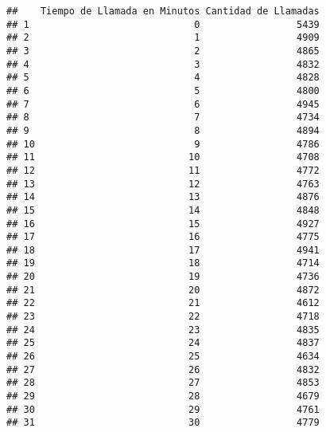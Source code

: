 \documentclass[
]{article}
\newenvironment{Shaded}{\begin{snugshade}}{\end{snugshade}}
\newcommand{\CommentTok}[1]{\textcolor[rgb]{0.56,0.35,0.01}{\textit{#1}}}
\newcommand{\FunctionTok}[1]{\textcolor[rgb]{0.13,0.29,0.53}{\textbf{#1}}}
\newcommand{\NormalTok}[1]{#1}
\newcommand{\OtherTok}[1]{\textcolor[rgb]{0.56,0.35,0.01}{#1}}
\newcommand{\SpecialCharTok}[1]{\textcolor[rgb]{0.81,0.36,0.00}{\textbf{#1}}}
\newcommand{\StringTok}[1]{\textcolor[rgb]{0.31,0.60,0.02}{#1}}
\begin{document}
\begin{Shaded}
\end{Shaded}

\begin{verbatim}
##    Tiempo de Llamada en Minutos Cantidad de Llamadas
## 1                             0                 5439
## 2                             1                 4909
## 3                             2                 4865
## 4                             3                 4832
## 5                             4                 4828
## 6                             5                 4800
## 7                             6                 4945
## 8                             7                 4734
## 9                             8                 4894
## 10                            9                 4786
## 11                           10                 4708
## 12                           11                 4772
## 13                           12                 4763
## 14                           13                 4876
## 15                           14                 4848
## 16                           15                 4927
## 17                           16                 4775
## 18                           17                 4941
## 19                           18                 4714
## 20                           19                 4736
## 21                           20                 4872
## 22                           21                 4612
## 23                           22                 4718
## 24                           23                 4835
## 25                           24                 4837
## 26                           25                 4634
## 27                           26                 4832
## 28                           27                 4853
## 29                           28                 4679
## 30                           29                 4761
## 31                           30                 4779
\end{verbatim}
\end{document}
